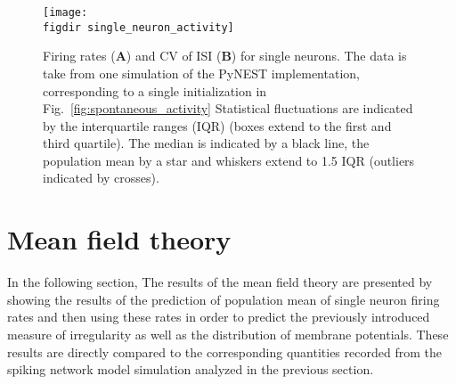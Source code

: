 \begin{figure}[tb]
    \centering
    \texttt{[image: \\figdir single\_neuron\_activity]}
    \caption[Single neuron firing rates and CV of ISI]{
        Firing rates (\textbf{A}) and CV of ISI (\textbf{B}) for single neurons. 
        The data is take from one simulation of the PyNEST implementation, 
        corresponding to a single initialization in Fig.~\ref{fig:spontaneous_activity}
        Statistical fluctuations 
        are indicated by the interquartile ranges (IQR) (boxes extend to 
        the first and third quartile). 
        The median is indicated by a black line, the population mean by a star and 
        whiskers extend to 1.5 IQR (outliers indicated by crosses). 
    }
    \label{fig:single_neuron_activity}
\end{figure}

\FloatBarrier
\section{Mean field theory}
In the following section, The results of the mean field theory are presented 
by showing the results of the prediction of 
population mean of single neuron firing rates and then using these rates 
in order to predict the previously introduced measure of irregularity
as well as the distribution of membrane potentials. 
These results are directly compared to 
the corresponding quantities recorded from the spiking network 
model simulation analyzed in the previous section. 

